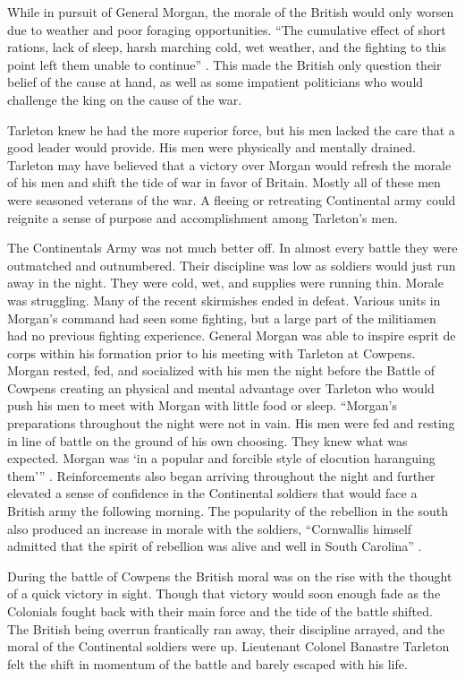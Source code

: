 While in pursuit of General Morgan, the morale of the British would only worsen
due to weather and poor foraging opportunities. “The cumulative effect of short
rations, lack of sleep, harsh marching cold, wet weather, and the fighting to
this point left them unable to continue” \cite[93]{babits_devil_2001}.  This made the
British only question their belief of the cause at hand, as well as some
impatient politicians who would challenge the king on the cause of the war. 

Tarleton knew he had the more superior force, but his men lacked the care that a
good leader would provide.  His men were physically and mentally drained.
Tarleton may have believed that a victory over Morgan would refresh the morale
of his men and shift the tide of war in favor of Britain.  Mostly all of these
men were seasoned veterans of the war. A fleeing or retreating Continental army
could reignite a sense of purpose and accomplishment among Tarleton’s men.   

The Continentals Army was not much better off.  In almost every battle they were
outmatched and outnumbered. Their discipline was low as soldiers would just run
away in the night. They were cold, wet, and supplies were running thin.  Morale
was struggling.  Many of the recent skirmishes ended in defeat.  Various units
in Morgan’s command had seen some fighting, but a large part of the militiamen
had no previous fighting experience.  General Morgan was able to inspire esprit
de corps within his formation prior to his meeting with Tarleton at Cowpens.
Morgan rested, fed, and socialized with his men the night before the Battle of
Cowpens creating an physical and mental advantage over Tarleton who would push
his men to meet with Morgan with little food or sleep.  “Morgan’s preparations
throughout the night were not in vain.  His men were fed and resting in line of
battle on the ground of his own choosing.  They knew what was expected.  Morgan
was ‘in a popular and forcible style of elocution haranguing them’”
\cite[p.60]{babits_devil_2001}.  Reinforcements also began arriving throughout the night
and further elevated a sense of confidence in the Continental soldiers that
would face a British army the following morning.   The popularity of the
rebellion in the south also produced an increase in morale with the soldiers,
“Cornwallis himself admitted that the spirit of rebellion was alive and well in
South Carolina” \cite[p.307]{buchanan_road_1997}. 

During the battle of Cowpens the British moral was on the rise with the thought
of a quick victory in sight. Though that victory would soon enough fade as the
Colonials fought back with their main force and the tide of the battle shifted.
The British being overrun frantically ran away, their discipline arrayed, and
the moral of the Continental soldiers were up. Lieutenant Colonel Banastre
Tarleton felt the shift in momentum of the battle and barely escaped with his
life. 

